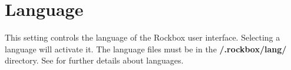 \section{\label{ref:Language}Language}
  This setting controls the language of the Rockbox user interface. Selecting a language will activate it. The language files must be in the \textbf{/.rockbox/lang/} directory. See  for further details about languages.
